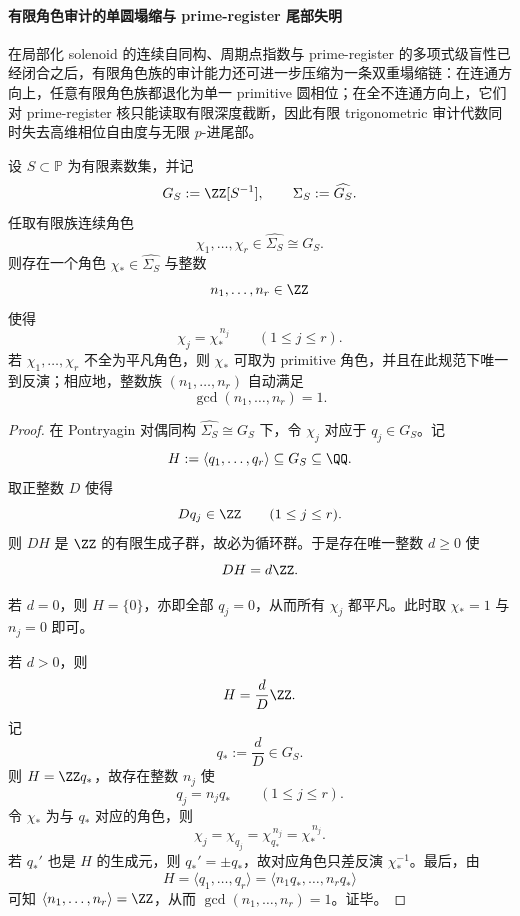 \paragraph{有限角色审计的单圆塌缩与 prime-register 尾部失明}
在局部化 solenoid 的连续自同构、周期点指数与 prime-register 的多项式级盲性已经闭合之后，有限角色族的审计能力还可进一步压缩为一条双重塌缩链：在连通方向上，任意有限角色族都退化为单一 primitive 圆相位；在全不连通方向上，它们对 prime-register 核只能读取有限深度截断，因此有限 trigonometric 审计代数同时失去高维相位自由度与无限 \(p\)-进尾部。

\begin{theorem}\label{thm:xi-time-part69-finite-character-family-single-primitive-phase}
设 \(S\subset\mathbb P\) 为有限素数集，并记
\[
G_S:=\ZZ[S^{-1}],
\qquad
\Sigma_S:=\widehat{G_S}.
\]
任取有限族连续角色
\[
\chi_1,\dots,\chi_r\in \widehat{\Sigma_S}\cong G_S.
\]
则存在一个角色 \(\chi_\ast\in\widehat{\Sigma_S}\) 与整数
\[
n_1,\dots,n_r\in\ZZ
\]
使得
\[
\chi_j=\chi_\ast^{\,n_j}
\qquad(1\le j\le r).
\]
若 \(\chi_1,\dots,\chi_r\) 不全为平凡角色，则 \(\chi_\ast\) 可取为 primitive 角色，并且在此规范下唯一到反演；相应地，整数族 \((n_1,\dots,n_r)\) 自动满足
\[
\gcd(n_1,\dots,n_r)=1.
\]
\end{theorem}
\begin{proof}
在 Pontryagin 对偶同构
\(
\widehat{\Sigma_S}\cong G_S
\)
下，令 \(\chi_j\) 对应于 \(q_j\in G_S\)。记
\[
H:=\langle q_1,\dots,q_r\rangle\subseteq G_S\subseteq \QQ.
\]
取正整数 \(D\) 使得
\[
Dq_j\in\ZZ
\qquad(1\le j\le r).
\]
则 \(DH\) 是 \(\ZZ\) 的有限生成子群，故必为循环群。于是存在唯一整数 \(d\ge 0\) 使
\[
DH=d\ZZ.
\]

若 \(d=0\)，则 \(H=\{0\}\)，亦即全部 \(q_j=0\)，从而所有 \(\chi_j\) 都平凡。此时取 \(\chi_\ast=1\) 与 \(n_j=0\) 即可。

若 \(d>0\)，则
\[
H=\frac{d}{D}\ZZ.
\]
记
\[
q_\ast:=\frac{d}{D}\in G_S.
\]
则 \(H=\ZZ q_\ast\)，故存在整数 \(n_j\) 使
\[
q_j=n_j q_\ast
\qquad(1\le j\le r).
\]
令 \(\chi_\ast\) 为与 \(q_\ast\) 对应的角色，则
\[
\chi_j=\chi_{q_j}=\chi_{q_\ast}^{\,n_j}=\chi_\ast^{\,n_j}.
\]
若 \(q_\ast'\) 也是 \(H\) 的生成元，则 \(q_\ast'=\pm q_\ast\)，故对应角色只差反演 \(\chi_\ast^{-1}\)。最后，由
\[
H=\langle q_1,\dots,q_r\rangle=\langle n_1 q_\ast,\dots,n_r q_\ast\rangle
\]
可知 \(\langle n_1,\dots,n_r\rangle=\ZZ\)，从而 \(\gcd(n_1,\dots,n_r)=1\)。证毕。
\end{proof}

